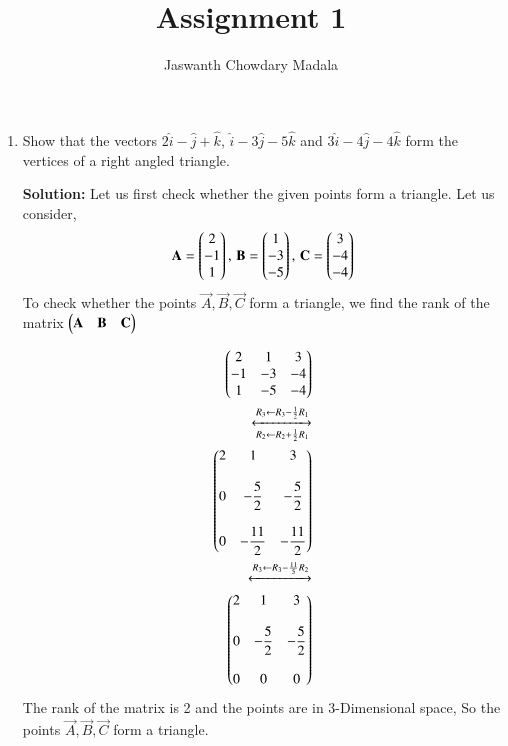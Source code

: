 \documentclass[journal,12pt,twocolumn]{IEEEtran}
\begin{document}
\vspace{3cm}


\title{Assignment 1}
\author{Jaswanth Chowdary Madala}





\maketitle

\newpage


\bigskip

\renewcommand{\thefigure}{\theenumi}
\renewcommand{\thetable}{\theenumi}


\begin{enumerate}

\item Show that the vectors $2\hat{i}-\hat{j}+\hat{k}$, $\hat{i}-3\hat{j}-5\hat{k}$ and $3\hat{i}-4\hat{j}-4\hat{k}$ form the vertices of a right angled triangle.

\textbf{Solution:} Let us first check whether the given points form a triangle. Let us consider, 
\begin{align}
\mathbf{A} = \begin{pmatrix}2\\-1\\1\end{pmatrix}, \, \mathbf{B} = \begin{pmatrix}1\\-3\\-5\end{pmatrix}, \, \mathbf{C}=\begin{pmatrix}3\\-4\\-4\end{pmatrix} 
\end{align}
To check whether the points $\vec{A},\vec{B},\vec{C}$ form a triangle, we find the rank of the matrix $\begin{pmatrix}\mathbf{A}&\mathbf{B}&\mathbf{C}\end{pmatrix}$

\begin{align}
\begin{pmatrix}2&1&3\\-1&-3&-4\\1&-5&-4\end{pmatrix}\\
\xleftrightarrow [R_2 \leftarrow R_2+\frac{1}{2}R_1]{R_3 \leftarrow R_3-\frac{1}{2}R_1} \\
\begin{pmatrix}2&1&3\\ \\0&-\dfrac{5}{2}&-\dfrac{5}{2}\\\\0&-\dfrac{11}{2}&-\dfrac{11}{2}\end{pmatrix}\\
\xleftrightarrow[]{R_3 \leftarrow R_3-\frac{11}{5}R_2}\\
\begin{pmatrix}2&1&3\\ \\0&-\dfrac{5}{2}&-\dfrac{5}{2}\\\\0&0&0\end{pmatrix}
\end{align}
The rank of the matrix is 2 and the points are in 3-Dimensional space, So the points $\vec{A},\vec{B},\vec{C}$ form a triangle.\\


\end{enumerate}
\end{document}
